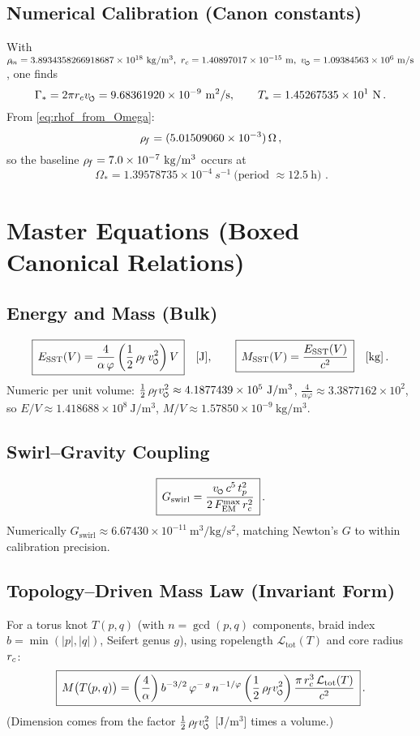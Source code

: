 \documentclass[11pt]{article}
\begin{document}
\subsection*{Numerical Calibration (Canon constants)}
With
$\rhom=3.8934358266918687\times 10^{18}\ \si{kg/m^3},\
\rc=1.40897017\times 10^{-15}\ \si{m},\
\vscore=1.09384563\times 10^{6}\ \si{m/s}$, one finds
\[
    \Gamma_* = 2\pi \rc \vscore = 9.68361920\times 10^{-9}\ \si{m^2/s}, \qquad
    T_* = 1.45267535\times 10^{1}\ \si{N}\,.
\]
From \eqref{eq:rhof_from_Omega}:
\[
    \rhof = (5.01509060\times 10^{-3})\,\Omega\,,
\]
so the baseline $\rhof = 7.0\times 10^{-7}\ \si{kg/m^3}$ occurs at
\[
    \boxed{\,\Omega_* = 1.39578735\times 10^{-4}\ \si{s^{-1}}\ \text{(period }\approx 12.5~\text{h})\,}\,.
\]

\section{Master Equations (Boxed Canonical Relations)}
\label{sec:master_equations}
\subsection*{Energy and Mass (Bulk)}
    \[
        \boxed{\,E_{\text{SST}}(V) = \frac{4}{\alpha\,\varphi}\left(\frac{1}{2}\,\rhof\,\vscore^2\right) V\,}\quad [\mathrm{J}],
        \qquad
        \boxed{\,M_{\text{SST}}(V) = \frac{E_{\text{SST}}(V)}{c^2}\,}\quad [\mathrm{kg}]\,.
    \]
    Numeric per unit volume: $\tfrac12\,\rhof \vscore^2 \approx 4.1877439\times10^5\ \mathrm{J/m^3}$, $\frac{4}{\alpha\varphi}\approx 3.3877162\times10^2$, so $E/V \approx 1.418688\times10^8\ \mathrm{J/m^3}$, $M/V \approx 1.57850\times10^{-9}\ \mathrm{kg/m^3}$.

\subsection*{Swirl–Gravity Coupling}
    \[
        \boxed{\,G_{\text{swirl}} = \frac{\vscore\,c^5\,t_p^2}{2\,F_{\text{EM}}^{\max}\,\rc^2}\,}\,.
    \]
    Numerically $G_{\text{swirl}}\approx 6.67430\times10^{-11}\ \mathrm{m^3/kg/s^2}$, matching Newton's $G$ to within calibration precision.

\subsection*{Topology–Driven Mass Law (Invariant Form)}
    For a torus knot $T(p,q)$ (with $n=\gcd(p,q)$ components, braid index $b=\min(|p|,|q|)$, Seifert genus $g$), using ropelength $\mathcal{L}_{\text{tot}}(T)$ and core radius $\rc$:
    \[
        \boxed{\,M\big(T(p,q)\big)
            = \left(\frac{4}{\alpha}\right) b^{-3/2}\,\varphi^{-\,g}\,n^{-1/\varphi}
            \left(\frac{1}{2}\,\rhof \vscore^2\right) \frac{\pi\,\rc^3\,\mathcal{L}_{\text{tot}}(T)}{c^2}\,}\,.
    \]
    (Dimension comes from the factor $\tfrac12\,\rhof \vscore^2$ [J/m$^3$] times a volume.)
\end{document}
